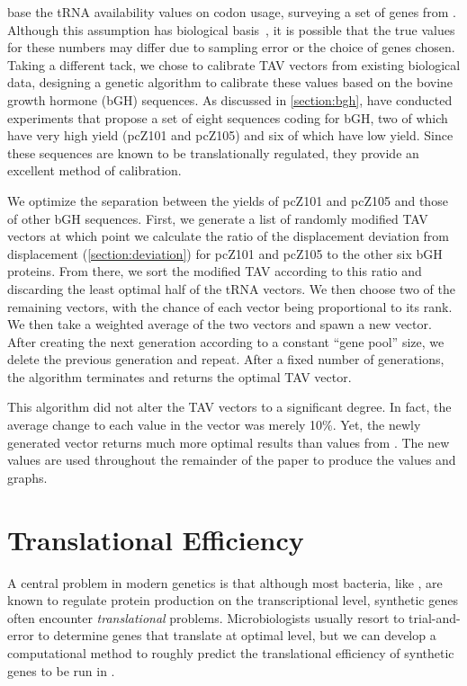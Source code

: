 \documentclass[12pt]{article}
\numberwithin{equation}{section}
\begin{document}
\citeauthor{lalit:embs} base the tRNA availability values on codon usage, 
surveying a set of genes from \ecoli.
Although this assumption has biological basis~\cite{ikemura}, 
it is possible that the true values for these numbers may differ 
due to sampling error or the choice of genes chosen.
Taking a different tack, we chose to calibrate TAV vectors from
existing biological data, designing a genetic algorithm to calibrate
these values based on the bovine growth hormone (bGH) sequences.
As discussed in \autoref{section:bgh}, \citet{schoner:bgh}
have conducted experiments that propose a set of eight sequences coding for bGH,
two of which have very high yield (pcZ101 and pcZ105) and six of which have low yield.
Since these sequences are known to be translationally regulated, they
provide an excellent method of calibration.

We optimize the separation between the yields of pcZ101 and pcZ105 and those of other bGH sequences.  
First, we generate a list of randomly modified TAV vectors at which
point we calculate the ratio of the displacement deviation from
displacement (\autoref{section:deviation}) for pcZ101 and pcZ105 to the other
six bGH proteins. From there, we sort the modified TAV according to
this ratio and discarding the least optimal half of the tRNA
vectors. We then choose two of the remaining vectors, with the chance
of each vector being proportional to its rank.  We then take a
weighted average of the two vectors and spawn a new vector.  After
creating the next generation according to a constant ``gene pool''
size, we delete the previous generation and repeat. After a fixed
number of generations, the algorithm terminates and returns the
optimal TAV vector.

This algorithm did not alter the TAV vectors to a significant degree.
In fact, the average change to each value in the vector was merely
10\%.  Yet, the newly generated vector returns much more optimal
results than values from \citeauthor{lalit:embs}.  The new values
are used throughout the remainder of the paper to produce the 
values and graphs.

\section{Translational Efficiency}


A central problem in modern genetics is that
although most bacteria, like \ecoli, are known to regulate protein production
on the transcriptional level, synthetic genes often encounter \emph{translational}
problems.  Microbiologists usually resort to trial-and-error to determine genes
that translate at optimal level, but we can develop a computational method
to roughly predict the translational efficiency of synthetic genes to
be run in \ecoli.
\end{document}
